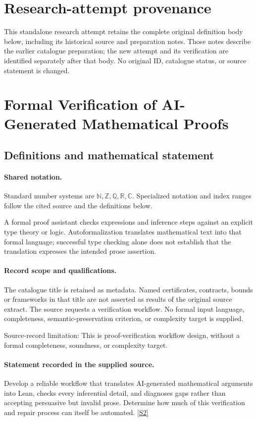\documentclass[11pt]{article}
\begin{document}
\section*{Research-attempt provenance}
This standalone research attempt retains the complete original definition body below,
including its historical source and preparation notes. Those notes describe the
earlier catalogue preparation; the new attempt and its verification are identified
separately after that body. No original ID, catalogue status, or source statement is changed.

\section{Formal Verification of AI-Generated Mathematical Proofs}\label{statement}

\subsection{Definitions and mathematical statement}

\paragraph{Shared notation.}Standard number systems are $\mathbb N,\mathbb Z,\mathbb Q,\mathbb R,\mathbb C$. Specialized notation and index ranges follow the cited source and the definitions below.


A formal proof assistant checks expressions and inference steps against an explicit type theory or logic. Autoformalization translates mathematical text into that formal language; successful type checking alone does not establish that the translation expresses the intended prose assertion.
\paragraph{Record scope and qualifications.}
The catalogue title is retained as metadata. Named certificates, contracts, bounds or frameworks in that title are not asserted as results of the original source extract.
The source requests a verification workflow. No formal input language, completeness, semantic-preservation criterion, or complexity target is supplied.

Source-record limitation: This is proof-verification workflow design, without a formal completeness, soundness, or complexity target.
\paragraph{Statement recorded in the supplied source.}
Develop a reliable workflow that translates AI-generated mathematical arguments into Lean, checks every inferential detail, and diagnoses gaps rather than accepting persuasive but invalid prose. Determine how much of this verification and repair process can itself be automated. \href{https://doi.org/10.4171/owr/2025/43}{[S2]}
\end{document}
